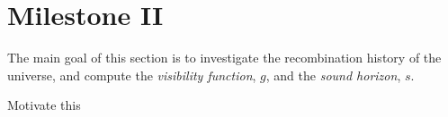 \section{Milestone II}\label{sec:m2}

The main goal of this section is to investigate the recombination history of the universe, and compute the \textit{visibility function}, $g$, and the \textit{sound horizon}, $s$. 

Motivate this





